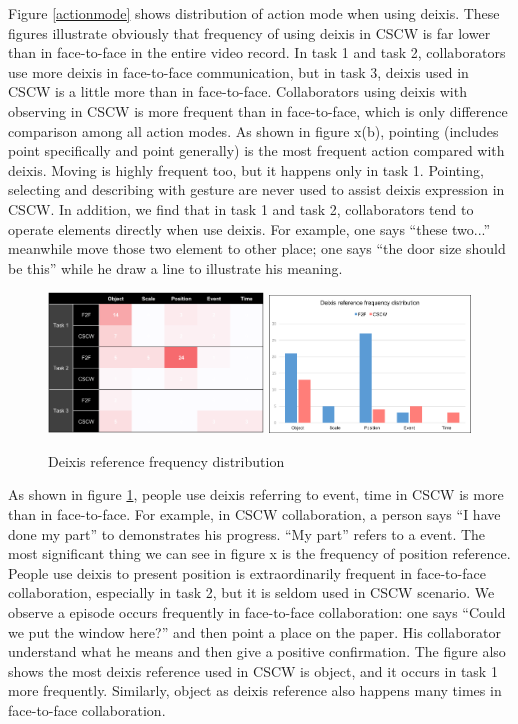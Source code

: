 \documentclass[12pt,twoside]{article}
\begin{document}
Figure \ref{actionmode} shows distribution of action mode when using deixis. These figures illustrate obviously that frequency of using deixis in CSCW is far lower than in face-to-face in the entire video record. In task 1 and task 2, collaborators use more deixis in face-to-face communication, but in task 3, deixis used in CSCW is a little more than in face-to-face.  Collaborators using deixis with observing in CSCW is more frequent than in face-to-face, which is only difference comparison among all action modes. As shown in figure x(b), pointing (includes point specifically and point generally) is the most frequent action compared with deixis. Moving is highly frequent too, but it happens only in task 1. Pointing, selecting and describing with gesture are never used to assist deixis expression in CSCW. In addition, we find that in task 1 and task 2, collaborators tend to operate elements directly when use deixis. For example, one says “these two...” meanwhile move those two element to other place; one says “the door size should be this” while he draw a line to illustrate his meaning.

\begin{figure}
\includegraphics[width = 0.51\textwidth]{deixis_reference_a.png}
\includegraphics[width = 0.476\textwidth]{deixis_reference_b.png}
\caption{Deixis reference frequency distribution}
\label{Deixis_reference}
\end{figure}

As shown in figure \ref{Deixis_reference}, people use deixis referring to event, time in CSCW is more than in face-to-face. For example, in CSCW collaboration, a person says “I have done my part” to demonstrates his progress. “My part” refers to a event. The most significant thing we can see in figure x is the frequency of position reference. People use deixis to present position is extraordinarily frequent in face-to-face collaboration, especially in task 2, but it is seldom used in CSCW scenario. We observe a episode occurs frequently in face-to-face collaboration: one says “Could we put the window here?” and then point a place on the paper. His collaborator understand what he means and then give a positive confirmation. The figure also shows the most deixis reference used in CSCW is object, and it occurs in task 1 more frequently. Similarly, object as deixis reference also happens many times in face-to-face collaboration. 
\end{document}
